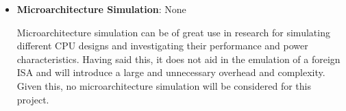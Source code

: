 \begin{itemize}
    \item \textbf{Microarchitecture Simulation}: None
    
    Microarchitecture simulation can be of great use in research for simulating different CPU designs and investigating their performance and power characteristics. Having said this, it does not aid in the emulation of a foreign ISA and will introduce a large and unnecessary overhead and complexity. Given this, no microarchitecture simulation will be considered for this project. 
\end{itemize}